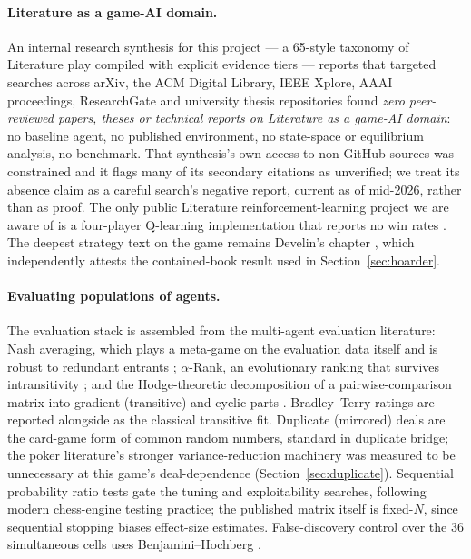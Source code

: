 \documentclass[11pt]{article}
\begin{document}
\paragraph{Literature as a game-AI domain.}
An internal research synthesis for this project \cite{playstyles} --- a 65-style taxonomy of
Literature play compiled with explicit evidence tiers --- reports that targeted searches
across arXiv, the ACM Digital Library, IEEE Xplore, AAAI proceedings, ResearchGate and
university thesis repositories found \emph{zero peer-reviewed papers, theses or technical
reports on Literature as a game-AI domain}: no baseline agent, no published environment, no
state-space or equilibrium analysis, no benchmark. That synthesis's own access to non-GitHub
sources was constrained and it flags many of its secondary citations as unverified; we treat
its absence claim as a careful search's negative report, current as of mid-2026, rather than
as proof. The only public Literature reinforcement-learning project we are aware of is a
four-player Q-learning implementation that reports no win rates \cite{somani}. The deepest
strategy text on the game remains Develin's chapter \cite{develin}, which independently
attests the contained-book result used in Section~\ref{sec:hoarder}.

\paragraph{Evaluating populations of agents.}
The evaluation stack is assembled from the multi-agent evaluation literature: Nash averaging,
which plays a meta-game on the evaluation data itself and is robust to redundant entrants
\cite{balduzzi2018}; $\alpha$-Rank, an evolutionary ranking that survives intransitivity
\cite{omidshafiei2019}; and the Hodge-theoretic decomposition of a pairwise-comparison matrix
into gradient (transitive) and cyclic parts \cite{jiang2011,balduzzi2018}. Bradley--Terry
ratings \cite{bradleyterry1952} are reported alongside as the classical transitive fit.
Duplicate (mirrored) deals are the card-game form of common random numbers, standard in
duplicate bridge; the poker literature's stronger variance-reduction machinery
\cite{burch2018} was measured to be unnecessary at this game's deal-dependence
(Section~\ref{sec:duplicate}). Sequential probability ratio tests \cite{wald1945} gate the
tuning and exploitability searches, following modern chess-engine testing practice; the
published matrix itself is fixed-$N$, since sequential stopping biases effect-size estimates.
False-discovery control over the 36 simultaneous cells uses Benjamini--Hochberg
\cite{benjamini1995}.
\end{document}
